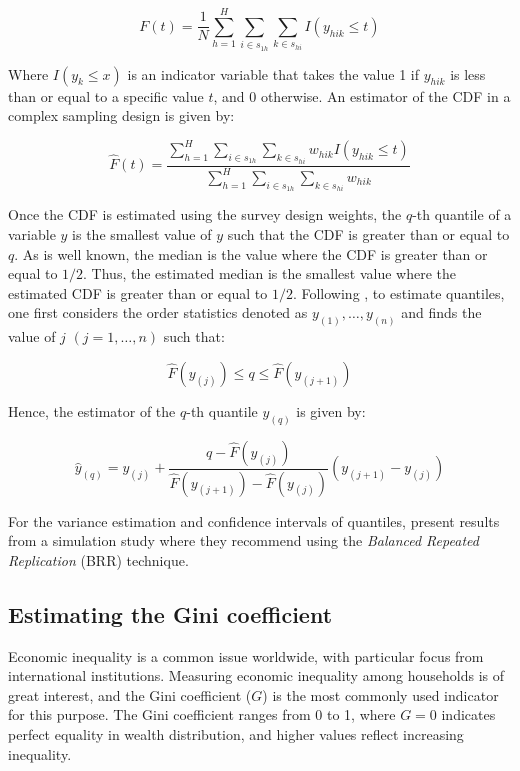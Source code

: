 \documentclass[
  12pt,
]{book}
\begin{document}
\[
F(t) = \frac{1}{N}\sum_{h=1}^{H}\sum_{i \in s_{1h}} \sum_{ k \in s_{hi}}  I(y_{hik} \leq t) 
\]

Where \(I(y_k \leq x)\) is an indicator variable that takes the value 1 if \(y_{hik}\) is less than or equal to a specific value \(t\), and 0 otherwise. An estimator of the CDF in a complex sampling design is given by:

\[
\widehat{F}(t) = \frac{\sum_{h=1}^{H}\sum_{i \in s_{1h}} \sum_{ k \in s_{hi}} w_{hik} I(y_{hik}\leq t)}{\sum_{h=1}^{H}\sum_{i \in s_{1h}} \sum_{ k \in s_{hi}} w_{hik}}
\]

Once the CDF is estimated using the survey design weights, the \(q\)-th quantile of a variable \(y\) is the smallest value of \(y\) such that the CDF is greater than or equal to \(q\). As is well known, the median is the value where the CDF is greater than or equal to \(1/2\). Thus, the estimated median is the smallest value where the estimated CDF is greater than or equal to \(1/2\). Following \citet{Heeringa2017}, to estimate quantiles, one first considers the order statistics denoted as \(y_{(1)}, \ldots, y_{(n)}\) and finds the value of \(j\) \((j=1, \ldots, n)\) such that:

\[
\widehat{F}(y_{(j)}) \leq q\leq\widehat{F}(y_{(j+1)})
\]

Hence, the estimator of the \(q\)-th quantile \(y_{(q)}\) is given by:

\[
\widehat{y}_{(q)} = y_{(j)} + \frac{q - \widehat{F}(y_{(j)})}{\widehat{F}(y_{(j+1)}) - \widehat{F}(y_{(j)})} (y_{(j+1)} - y_{(j)})
\]

For the variance estimation and confidence intervals of quantiles, \citet{kovar1988bootstrap} present results from a simulation study where they recommend using the \emph{Balanced Repeated Replication} (BRR) technique.

\subsection{Estimating the Gini coefficient}\label{estimating-the-gini-coefficient}

Economic inequality is a common issue worldwide, with particular focus from international institutions. Measuring economic inequality among households is of great interest, and the Gini coefficient (\(G\)) is the most commonly used indicator for this purpose. The Gini coefficient ranges from 0 to 1, where \(G = 0\) indicates perfect equality in wealth distribution, and higher values reflect increasing inequality.
\end{document}
